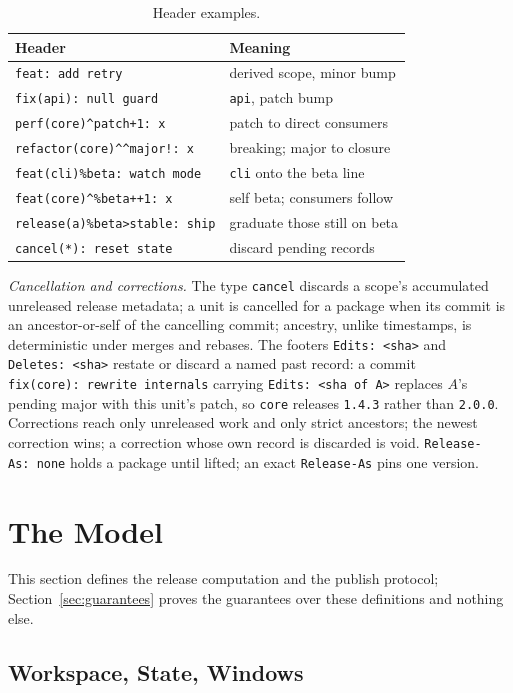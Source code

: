 \documentclass[10pt,conference]{IEEEtran}
\theoremstyle{definition}
\newcommand{\code}[1]{\texttt{#1}}
\begin{document}
\begin{table}[t]
\caption{Header examples.}
\label{tab:headers}
\small
\begin{tabular}{@{}ll@{}}
\toprule
Header & Meaning \\
\midrule
\code{feat: add retry} & derived scope, minor bump \\
\code{fix(api): null guard} & \code{api}, patch bump \\
\code{perf(core)\^{}patch+1: x} & patch to direct consumers \\
\code{refactor(core)\^{}\^{}major!: x} & breaking; major to closure \\
\code{feat(cli)\%beta: watch mode} & \code{cli} onto the beta line \\
\code{feat(core)\^{}\%beta++1: x} & self beta; consumers follow \\
\code{release(a)\%beta>stable: ship} & graduate those still on beta \\
\code{cancel(*): reset state} & discard pending records \\
\bottomrule
\end{tabular}
\end{table}

\emph{Cancellation and corrections.} The type \code{cancel} discards a
scope's accumulated unreleased release metadata; a unit is cancelled for
a package when its commit is an ancestor-or-self of the cancelling
commit; ancestry, unlike timestamps, is deterministic under merges and
rebases. The footers \code{Edits:~<sha>} and \code{Deletes:~<sha>}
restate or discard a named past record: a commit
\code{fix(core):~rewrite internals} carrying \code{Edits:~<sha of A>}
replaces $A$'s pending major with this unit's patch, so \code{core}
releases \code{1.4.3} rather than \code{2.0.0}. Corrections reach only
unreleased work and only strict ancestors; the newest correction wins; a
correction whose own record is discarded is void.
\code{Release-As:~none} holds a package until lifted; an exact
\code{Release-As} pins one version.

\section{The Model}
\label{sec:model}

This section defines the release computation and the publish protocol;
Section~\ref{sec:guarantees} proves the guarantees over these
definitions and nothing else.

\subsection{Workspace, State, Windows}
\end{document}
